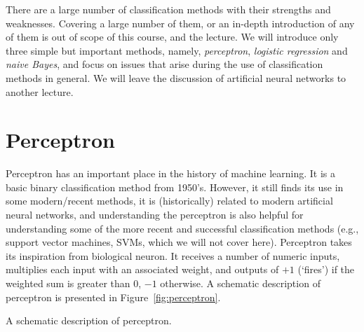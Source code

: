 There are a large number of classification methods
with their strengths and weaknesses. 
Covering a large number of them,
or an in-depth introduction of any of them
is out of scope of this course, and the lecture.
We will introduce only three simple but important methods,
namely, \emph{perceptron}, \emph{logistic regression} and \emph{naive Bayes},
and focus on issues that arise
during the use of classification methods in general. 
We will leave the discussion of artificial neural networks
to another lecture.

\section{Perceptron}

Perceptron has an important place in the history of machine learning.
It is a basic binary classification method from 1950's.
However, it still finds its use in some modern/recent methods,
it is (historically) related to modern artificial neural networks,
and understanding the perceptron is also helpful for understanding
some of the more recent and successful classification methods
(e.g., support vector machines, SVMs, which we will not cover here).
Perceptron takes its inspiration from biological neuron.%
It receives a number of numeric inputs,
multiplies each input with an associated weight,
and outputs of $+1$ (`fires') if the weighted sum is greater than $0$,
$-1$ otherwise.
A schematic description of perceptron is presented
in Figure~\ref{fig:perceptron}.
\begin{marginfigure}
  \centering

  \caption{\label{fig:perceptron}
    A schematic description of perceptron.
  }
\end{marginfigure}
